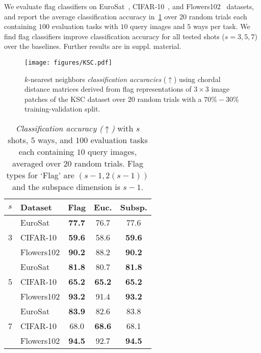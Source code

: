 We evaluate flag classifiers on EuroSat~\cite{helber2019eurosat}, CIFAR-10~\cite{krizhevsky2009learning}, and Flowers102~\cite{nilsback2008automated} datasets, and report the average classification accuracy in~\cref{tab:fewshot} over $20$ random trials each containing $100$ evaluation tasks with $10$ query images and $5$ ways per task. We find flag classifiers improve classification accuracy for all tested shots ($s=3,5,7$) over the baselines. Further results are in suppl. material.
\begin{figure}[t]
    \centering
    \texttt{[image: figures/KSC.pdf]}
    \caption{$k$-nearest neighbors \emph{classification accuracies} ($\uparrow$) using chordal distance matrices derived from flag representations of $3 \times 3$ image patches of the KSC dataset over $20$ random trials with a $70\%-30\%$ training-validation split. }
    \label{fig:ksc_knn}
\end{figure}
\setlength{\tabcolsep}{10pt}
\begin{table}[ht!]
    \centering
    \caption{\emph{Classification accuracy ($\uparrow$)} with $s$ shots, $5$ ways, and $100$ evaluation tasks each containing $10$ query images, averaged over $20$ random trials. Flag types for `Flag' are $(s-1,2(s-1))$ and the subspace dimension is $s-1$.}
    \label{tab:fewshot}
    \begin{tabular}{llccc}
    \toprule
    $s$ & Dataset & Flag & Euc. & Subsp. \\
    \midrule
    \multirow[t]{3}{*}{3} & EuroSat & \textbf{77.7}  & 76.7  & 77.6  \\
     & CIFAR-10 & \textbf{59.6}  & 58.6  & \textbf{59.6}  \\
     & Flowers102 & \textbf{90.2}  & 88.2  & \textbf{90.2}  \\
    \cline{1-5}
    \multirow[t]{3}{*}{5} & EuroSat & \textbf{81.8}  & 80.7  & \textbf{81.8}  \\
     & CIFAR-10 & \textbf{65.2}  & \textbf{65.2}  & \textbf{65.2}  \\
     & Flowers102 & \textbf{93.2}  & 91.4 & \textbf{93.2}  \\
    \cline{1-5}
    \multirow[t]{3}{*}{7} & EuroSat & \textbf{83.9}  & 82.6  & 83.8  \\
     & CIFAR-10 & 68.0  & \textbf{68.6}  & 68.1  \\
     & Flowers102 & \textbf{94.5} & 92.7 & \textbf{94.5}  \\
    \bottomrule
    \end{tabular}\vspace{-3mm}
\end{table}

